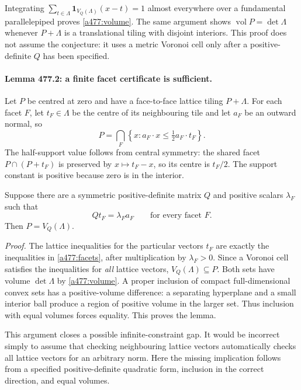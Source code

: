 \documentclass[11pt]{article}
\begin{document}
Integrating
$\sum_{t\in\Lambda}\mathbf1_{V_Q(\Lambda)}(x-t)=1$ almost everywhere
over a fundamental parallelepiped proves \eqref{a477:volume}. The same
argument shows $\operatorname{vol}P=\det\Lambda$ whenever $P+\Lambda$
is a translational tiling with disjoint interiors. This proof does not
assume the conjecture: it uses a metric Voronoi cell only after a
positive-definite $Q$ has been specified.

\paragraph{Lemma 477.2: a finite facet certificate is sufficient.}
Let $P$ be centred at zero and have a face-to-face lattice tiling
$P+\Lambda$. For each facet $F$, let $t_F\in\Lambda$ be the centre
of its neighbouring tile and let $a_F$ be an outward normal, so
\begin{equation}\label{a477:facets}
 P=\bigcap_F\left\{x:a_F\cdot x\le\tfrac12a_F\cdot t_F\right\}.
\end{equation}
The half-support value follows from central symmetry: the shared facet
$P\cap(P+t_F)$ is preserved by $x\mapsto t_F-x$, so its centre is
$t_F/2$. The support constant is positive because zero is in the
interior.

Suppose there are a symmetric positive-definite matrix $Q$ and positive
scalars $\lambda_F$ such that
\begin{equation}\label{a477:certificate}
                              Qt_F=\lambda_F a_F
                                  \qquad\text{for every facet }F.
\end{equation}
Then $P=V_Q(\Lambda)$.

\emph{Proof.} The lattice inequalities for the particular vectors $t_F$
are exactly the inequalities in \eqref{a477:facets}, after multiplication
by $\lambda_F>0$. Since a Voronoi cell satisfies the inequalities for
\emph{all} lattice vectors, $V_Q(\Lambda)\subseteq P$. Both sets have
volume $\det\Lambda$ by \eqref{a477:volume}. A proper inclusion of
compact full-dimensional convex sets has a positive-volume difference:
a separating hyperplane and a small interior ball produce a region of
positive volume in the larger set. Thus inclusion with equal volumes
forces equality. This proves the lemma.

This argument closes a possible infinite-constraint gap. It would be
incorrect simply to assume that checking neighbouring lattice vectors
automatically checks all lattice vectors for an arbitrary norm. Here
the missing implication follows from a specified positive-definite
quadratic form, inclusion in the correct direction, and equal volumes.
\end{document}
